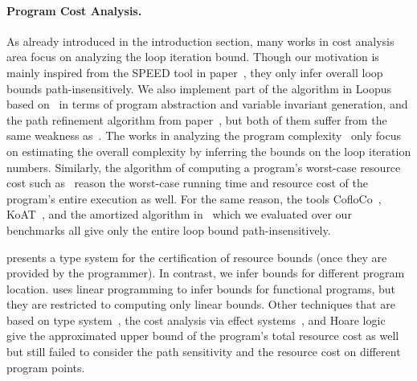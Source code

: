 \paragraph{Program Cost Analysis.}
As already introduced in the introduction section, many works in cost analysis area focus on analyzing the loop iteration bound.
Though our motivation is mainly inspired from the SPEED tool in paper~\cite{GulwaniZ10}, they only infer overall loop bounds path-insensitively.
We also implement part of the algorithm in Loopus based on~\cite{SinnZV17} in terms of program abstraction and variable invariant generation,
and the path refinement algorithm from paper~\cite{GulwaniJK09}, but both of them suffer from the same weakness as~\cite{GulwaniZ10}.
The works in analyzing the program complexity~\cite{GustafssonEL05,HumenbergerJK18} only focus on estimating 
the overall complexity 
by inferring the bounds on the loop iteration numbers.
Similarly, the algorithm of computing a program's worst-case resource cost
such as~\cite{AlbertAGP08,AliasDFG10} reason the worst-case running time and resource cost of the program's entire execution as well.
For the same reason, the tools CofloCo~\cite{Montoya17,Flores-MontoyaH14,Flores-Montoya16}, KoAT~\cite{BrockschmidtEFFG16,BrockschmidtEFFG14,FalkeKS12,FalkeKS11}, and the amortized algorithm in~\cite{LuCT21} which we evaluated over our benchmarks all give only the entire loop bound path-insensitively.

\cite{CraryW00} presents a type system for the certification of resource bounds (once they are provided by the programmer). In contrast, we infer bounds for different program location. 
\cite{JostHLH10} uses linear programming to infer bounds for functional programs, but they are restricted to computing only linear bounds.
Other techniques that are based on
type system~\cite{CicekBG0H17,RajaniG0021}, the cost analysis via effect systems~\cite{CicekBG0H17,RadicekBG0Z18,QuG019}, and Hoare logic~\cite{CarbonneauxHS15}
give the approximated upper bound of the program's total resource cost as well but still failed to consider the path sensitivity and the resource cost on different program points.

